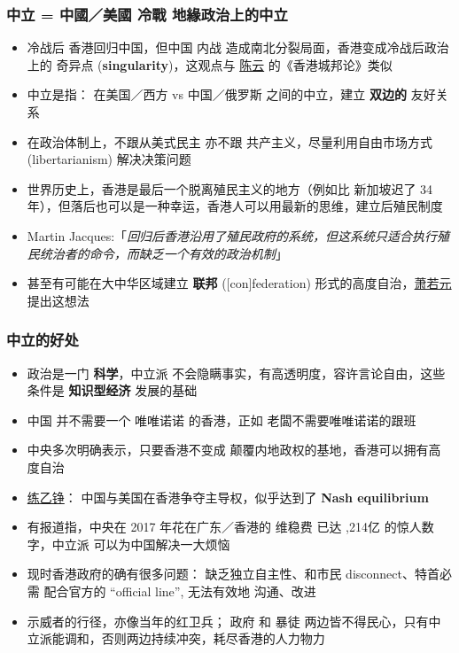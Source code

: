 \documentclass[10pt]{beamer}
\newcommand{\emp}[1]{{\color{blue}\textbf{#1}}}
\begin{document}
\begin{frame}
\frametitle{中立 = 中國／美國 冷戰 地緣政治上的中立}
\begin{itemize}
	\item 冷战后 香港回归中国，但中国 内战 造成南北分裂局面，香港变成冷战后政治上的 奇异点 (\emp{singularity})，这观点与 \underline{陈云} 的《香港城邦论》类似

	\item 中立是指： 在美国／西方 vs 中国／俄罗斯 之间的中立，建立 \emp{双边的} 友好关系
	
	\item 在政治体制上，不跟从美式民主 亦不跟 共产主义，尽量利用自由市场方式 (libertarianism) 解决决策问题

	\item 世界历史上，香港是最后一个脱离殖民主义的地方（例如比 新加坡迟了 34 年），但落后也可以是一种幸运，香港人可以用最新的思维，建立后殖民制度

	\item Martin Jacques:「\textit{回归后香港沿用了殖民政府的系统，但这系统只适合执行殖民统治者的命令，而缺乏一个有效的政治机制}」

	\item 甚至有可能在大中华区域建立 \emp{联邦} ([con]federation) 形式的高度自治，\underline{萧若元} 提出这想法
\end{itemize}
\end{frame}

\begin{frame}
\frametitle{中立的好处}
\begin{itemize}
	\item 政治是一门 \emp{科学}，中立派 不会隐瞒事实，有高透明度，容许言论自由，这些条件是 \emp{知识型经济} 发展的基础
	
	\item 中国 并不需要一个 唯唯诺诺 的香港，正如 老闆不需要唯唯诺诺的跟班
	
	\item 中央多次明确表示，只要香港不变成 颠覆内地政权的基地，香港可以拥有高度自治
	
	\item \underline{练乙铮}： 中国与美国在香港争夺主导权，似乎达到了 \emp{Nash equilibrium}

	\item 有报道指，中央在 2017 年花在广东／香港的 维稳费 已达 ,214亿 的惊人数字，中立派 可以为中国解决一大烦恼

	\item 现时香港政府的确有很多问题： 缺乏独立自主性、和市民 disconnect、特首必需 配合官方的 ``official line'', 无法有效地 沟通、改进

	\item 示威者的行径，亦像当年的红卫兵； 政府 和 暴徒 两边皆不得民心，只有中立派能调和，否则两边持续冲突，耗尽香港的人力物力

\end{itemize}
\end{frame}
\end{document}
